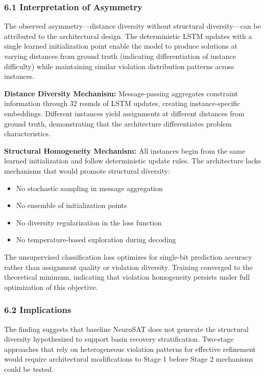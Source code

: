 
\subsubsection{6.1 Interpretation of Asymmetry}

The observed asymmetry—distance diversity without structural diversity—can be attributed to the architectural design. The deterministic LSTM updates with a single learned initialization point enable the model to produce solutions at varying distances from ground truth (indicating differentiation of instance difficulty) while maintaining similar violation distribution patterns across instances.

\textbf{Distance Diversity Mechanism:} Message-passing aggregates constraint information through 32 rounds of LSTM updates, creating instance-specific embeddings. Different instances yield assignments at different distances from ground truth, demonstrating that the architecture differentiates problem characteristics.

\textbf{Structural Homogeneity Mechanism:} All instances begin from the same learned initialization and follow deterministic update rules. The architecture lacks mechanisms that would promote structural diversity:
\begin{itemize}
\item No stochastic sampling in message aggregation
\item No ensemble of initialization points
\item No diversity regularization in the loss function
\item No temperature-based exploration during decoding
\end{itemize}

The unsupervised classification loss optimizes for single-bit prediction accuracy rather than assignment quality or violation diversity. Training converged to the theoretical minimum, indicating that violation homogeneity persists under full optimization of this objective.

\subsubsection{6.2 Implications}

The finding suggests that baseline NeuroSAT does not generate the structural diversity hypothesized to support basin recovery stratification. Two-stage approaches that rely on heterogeneous violation patterns for effective refinement would require architectural modifications to Stage 1 before Stage 2 mechanisms could be tested.

